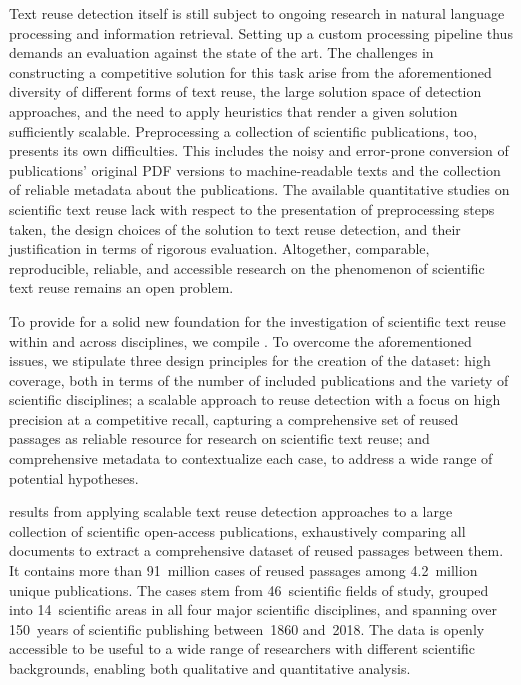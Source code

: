 Text reuse detection itself is still subject to ongoing research in natural language processing and information retrieval. Setting up a custom processing pipeline thus demands an evaluation against the state of the art. The challenges in constructing a competitive solution for this task arise from the aforementioned diversity of different forms of text reuse, the large solution space of detection approaches, and the need to apply heuristics that render a given solution sufficiently scalable. Preprocessing a collection of scientific publications, too, presents its own difficulties. This includes the noisy and error-prone conversion of publications' original PDF versions to machine-readable texts and the collection of reliable metadata about the publications. The available quantitative studies on scientific text reuse lack with respect to the presentation of preprocessing steps taken, the design choices of the solution to text reuse detection, and their justification in terms of rigorous evaluation. Altogether, comparable, reproducible, reliable, and accessible research on the phenomenon of scientific text reuse remains an open problem.

To provide for a solid new foundation for the investigation of scientific text reuse within and across disciplines, we compile \webisReuseCorpus. To overcome the aforementioned issues, we stipulate three design principles for the creation of the dataset:
\Ni
high coverage, both in terms of the number of included publications and the variety of scientific disciplines;
\Nii
a scalable approach to reuse detection with a focus on high precision at a competitive recall, capturing a comprehensive set of reused passages as reliable resource for research on scientific text reuse; and 
\Niii
comprehensive metadata to contextualize each case, to address a wide range of potential hypotheses.

\webisReuseCorpus results from applying scalable text reuse detection approaches to a large collection of scientific open-access publications, exhaustively comparing all documents to extract a comprehensive dataset of reused passages between them. It contains more than 91~million cases of reused passages among 4.2~million unique publications. The cases stem from 46~scientific fields of study, grouped into 14~scientific areas in all four major scientific disciplines, and spanning over 150~years of scientific publishing between~1860 and~2018. The data is openly accessible to be useful to a wide range of researchers with different scientific backgrounds, enabling both qualitative and quantitative analysis.



